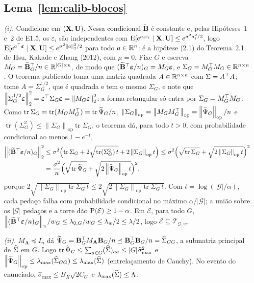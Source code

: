 \documentclass[11pt,a4paper]{article}
\newcommand{\lmaxx}{\lambda_{\max}}
\newcommand{\Amat}{\mathbf{A}}
\newcommand{\Bmat}{\mathbf{B}}
\newcommand{\Btil}{\widetilde{\Bmat}}
\newcommand{\MA}{M_{\Amat}}
\newcommand{\bveps}{\boldsymbol{\varepsilon}}
\newcommand{\smax}{\widehat{\sigma}_{\max}}
\newcommand{\opnorm}[1]{\left\lVert #1 \right\rVert_{\mathrm{op}}}
\newcommand{\Gcal}{\mathcal{G}}
\newcommand{\Psitil}{\widetilde{\Psi}}
\newcommand{\lamz}[1]{\lambda_{0,#1}}
\newcommand{\Tw}{\mathcal{T}_{\mathcal{G},w}}
\newcommand{\Ecal}{\mathcal{E}}
\begin{document}
\subsection*{Lema~\ref{lem:calib-blocos}}

\emph{(i).} Condicione em $(\mathbf{X},\mathbf{U})$. Nessa condicional $\Btil$ é constante e,
pelas Hipóteses~1 e~2 de E1.5, os $\varepsilon_{i}$ são independentes com
$\mathrm{E}[e^{a_{i}\varepsilon_{i}}\mid\mathbf{X},\mathbf{U}] \le e^{\sigma^{2}a_{i}^{2}/2}$, logo
$\E[e^{a\T\bveps}\mid\bX,\bU] \le e^{\sigma^{2}\norm{a}_{2}^{2}/2}$ para todo
$a \in \mathbb{R}^{n}$: é a hipótese (2.1) do Teorema~2.1 de Hsu, Kakade e Zhang
(2012), com $\mu = 0$. Fixe $G$ e escreva $M_{G} = \Btil_{G}\T/n \in
\R^{|G|\times n}$, de modo que $(\Btil\T\bveps/n)_{G} = M_{G}\bveps$, e
$\Sigma_{G} = M_{G}^{\top} M_{G} \in \mathbb{R}^{n\times n}$. O teorema publicado toma uma
matriz quadrada $A \in \mathbb{R}^{n\times n}$ com $\Sigma = A^{\top} A$; tome
$A = \Sigma_{G}^{1/2}$, que é quadrada e tem o mesmo $\Sigma_{G}$, e note que
$\norm{\Sigma_{G}^{1/2}\bveps}_{2}^{2} = \bveps\T\Sigma_{G}\bveps =
\norm{M_{G}\bveps}_{2}^{2}$: a forma retangular só entra por
$\Sigma_{G} = M_{G}^{\top} M_{G}$. Como $\operatorname{tr}\Sigma_{G} =
\operatorname{tr}(M_{G}M_{G}\T) = \operatorname{tr}\Psitil_{G}/n$,
$\opnorm{\Sigma_{G}} = \opnorm{M_{G}M_{G}\T} = \opnorm{\Psitil_{G}}/n$ e
$\operatorname{tr}(\Sigma_{G}^{2}) \le
\opnorm{\Sigma_{G}}\operatorname{tr}\Sigma_{G}$, o teorema dá, para todo
$t > 0$, com probabilidade condicional ao menos $1 - e^{-t}$,
\[
  \begin{aligned}
  \norm{(\Btil\T\bveps/n)_{G}}_{2}^{2}
  &\le \sigma^{2}\Bigl(\operatorname{tr}\Sigma_{G} +
  2\sqrt{\operatorname{tr}(\Sigma_{G}^{2})\,t} + 2\opnorm{\Sigma_{G}}t\Bigr)
  \le \sigma^{2}\Bigl(\sqrt{\operatorname{tr}\Sigma_{G}} +
  \sqrt{2\opnorm{\Sigma_{G}}t}\Bigr)^{2}\\
  &= \frac{\sigma^{2}}{n}\Bigl(\sqrt{\operatorname{tr}\Psitil_{G}} +
  \sqrt{2\opnorm{\Psitil_{G}}t}\Bigr)^{2},
  \end{aligned}
\]
porque $2\sqrt{\opnorm{\Sigma_{G}}\operatorname{tr}\Sigma_{G}\,t} \le
2\sqrt{2\opnorm{\Sigma_{G}}\operatorname{tr}\Sigma_{G}\,t}$. Com
$t = \log(|\Gcal|/\alpha)$, cada pedaço falha com probabilidade condicional no
máximo $\alpha/|\Gcal|$; a união sobre os $|\Gcal|$ pedaços e a torre dão
$\Prob(\Ecal) \ge 1-\alpha$. Em $\Ecal$, para todo $G$,
$\norm{(\Btil\T\bveps/n)_{G}}_{2}/w_{G} \le \lamz{G}/w_{G} \le \pen_{w}/2 \le
\pen/2$, logo $\Ecal \subseteq \Tw$.

\emph{(ii).} $\MA \preceq I_{n}$ dá $\Psitil_{G} = \Bmat_{G}\T\MA\Bmat_{G}/n
\preceq \Bmat_{G}\T\Bmat_{G}/n = \Gramhat_{GG}$, a submatriz principal de
$\widehat{\Sigma}$ em $G$. Logo $\operatorname{tr}\Psitil_{G} \le
\sum_{a\in G}(\Gramhat)_{aa} \le |G|\smax^{2}$ e
$\opnorm{\Psitil_{G}} \le \lmaxx(\Gramhat_{GG}) \le \lmaxx(\Gramhat)$
(entrelaçamento de Cauchy). No evento do enunciado,
$\smax \le B_{X}\sqrt{2C_{U}}$ e $\lmaxx(\Gramhat) \le \Lambda$.
\end{document}
